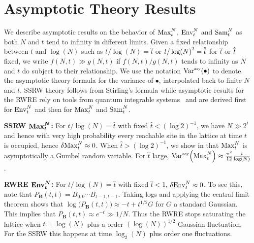 \section{Asymptotic Theory Results}
We describe asymptotic results on the behavior of $\mathrm{Max}^{N}_t$, $\mathrm{Env}^{N}_t$ and $\mathrm{Sam}^{N}_t$ as both $N$ and $t$ tend to infinity in different limits. Given a fixed relationship between $t$ and $\log(N)$ such as $t/\log(N)=\hat{t}$ or  $t/\log(N)^2=\hathat{t}$ for $\hat{t}$ or $\hathat{t}$ fixed, we write $f(N,t)\gg g(N,t)$ if $f(N,t)/g(N,t)$ tends to infinity as $N$ and $t$ do subject to their relationship. We use the notation $\mathrm{Var}^{\textrm{\tiny{asy}}}\!\left(\bullet\right)$ to denote the asymptotic theory formula for the variance of $\bullet$, interpolated back to finite $N$ and $t$. SSRW theory follows from Stirling's formula while asymptotic results for the RWRE rely on tools from quantum integrable systems~\cite{barraquand_random-walk_2017, barraquand_moderate_2020,krajenbrink_crossover_2022} and are derived first for $\mathrm{Env}^{N}_t$ and then for $\mathrm{Max}^{N}_t$ and $\mathrm{Sam}^{N}_t$.

\noindent\textbf{SSRW $\boldsymbol{\mathrm{Max}^{N}_t}$:}
For $t/\log(N)=\hat{t}$ with fixed $\hat{t} < (\log 2)^{-1}$, we have $N\gg 2^t$ and hence with very high probability every reachable site in the lattice at time $t$ is occupied, hence $\var{\mathrm{Max}^{N}_t}\approx 0$. When $\hat{t} > (\log 2)^{-1}$, we show  in \cite{SeeSupplementalMaterial} that $\mathrm{Max}^{N}_t$ is asymptotically a Gumbel random variable. For $\hat{t}$ large, $\mathrm{Var}^{\textrm{\tiny{asy}}}\!\left(\mathrm{Max}^{N}_t\right) \approx \frac{\pi^2}{12} \frac{t}{\log(N)}$.


\noindent\textbf{RWRE $\boldsymbol{\mathrm{Env}^{N}_t}$:}
For $t/\log(N)=\hat{t}$ with fixed $\hat{t}<1$, $\var{\mathrm{Env}^{N}_t}\approx 0$. To see this, note that $P_\mathbf{B}(t,t) = B_{0,0} \cdots B_{t-1,t-1}$. Taking logs and applying the central limit theorem shows that $\log \big(P_\mathbf{B}(t,t)\big) \approx -t  + t^{1/2} G$ for $G$ a standard Gaussian. This implies that $P_\mathbf{B}(t,t) \approx e^{-t}\gg 1/N$. Thus the RWRE stops saturating the lattice when $t= \log(N)$ plus a order $(\log(N))^{1/2}$ Gaussian fluctuation. For the SSRW this happens at time $\log_2(N)$ plus order one fluctuations.


